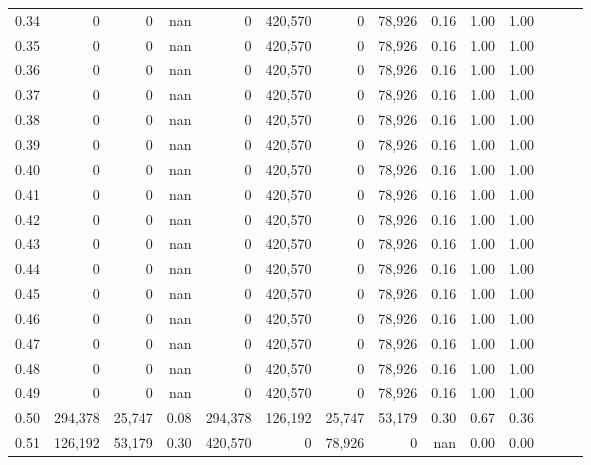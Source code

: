 \begin{tabular}{rrrrrrrrrrrrrr}
0.34 &        0 &       0 &   nan &        0 &  420,570 &       0 &  78,926 &  0.16 &  1.00 &      1.00 \\
0.35 &        0 &       0 &   nan &        0 &  420,570 &       0 &  78,926 &  0.16 &  1.00 &      1.00 \\
0.36 &        0 &       0 &   nan &        0 &  420,570 &       0 &  78,926 &  0.16 &  1.00 &      1.00 \\
0.37 &        0 &       0 &   nan &        0 &  420,570 &       0 &  78,926 &  0.16 &  1.00 &      1.00 \\
0.38 &        0 &       0 &   nan &        0 &  420,570 &       0 &  78,926 &  0.16 &  1.00 &      1.00 \\
0.39 &        0 &       0 &   nan &        0 &  420,570 &       0 &  78,926 &  0.16 &  1.00 &      1.00 \\
0.40 &        0 &       0 &   nan &        0 &  420,570 &       0 &  78,926 &  0.16 &  1.00 &      1.00 \\
0.41 &        0 &       0 &   nan &        0 &  420,570 &       0 &  78,926 &  0.16 &  1.00 &      1.00 \\
0.42 &        0 &       0 &   nan &        0 &  420,570 &       0 &  78,926 &  0.16 &  1.00 &      1.00 \\
0.43 &        0 &       0 &   nan &        0 &  420,570 &       0 &  78,926 &  0.16 &  1.00 &      1.00 \\
0.44 &        0 &       0 &   nan &        0 &  420,570 &       0 &  78,926 &  0.16 &  1.00 &      1.00 \\
0.45 &        0 &       0 &   nan &        0 &  420,570 &       0 &  78,926 &  0.16 &  1.00 &      1.00 \\
0.46 &        0 &       0 &   nan &        0 &  420,570 &       0 &  78,926 &  0.16 &  1.00 &      1.00 \\
0.47 &        0 &       0 &   nan &        0 &  420,570 &       0 &  78,926 &  0.16 &  1.00 &      1.00 \\
0.48 &        0 &       0 &   nan &        0 &  420,570 &       0 &  78,926 &  0.16 &  1.00 &      1.00 \\
0.49 &        0 &       0 &   nan &        0 &  420,570 &       0 &  78,926 &  0.16 &  1.00 &      1.00 \\
0.50 &  294,378 &  25,747 &  0.08 &  294,378 &  126,192 &  25,747 &  53,179 &  0.30 &  0.67 &      0.36 \\
0.51 &  126,192 &  53,179 &  0.30 &  420,570 &        0 &  78,926 &       0 &   nan &  0.00 &      0.00 \\

\end{tabular}
